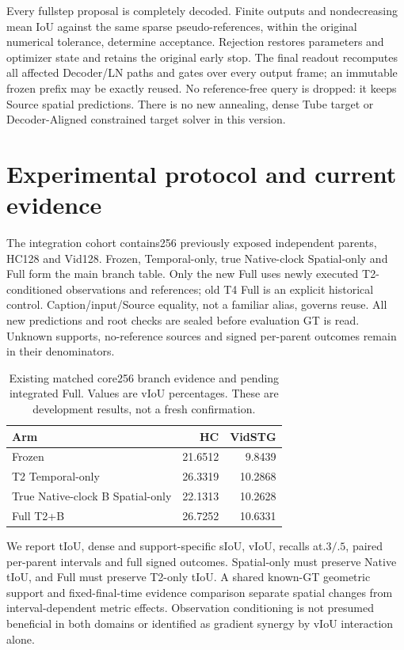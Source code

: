 \documentclass[11pt]{article}
\begin{document}
Every fullstep proposal is completely decoded. Finite outputs and nondecreasing mean IoU against the same sparse pseudo-references, within the original numerical tolerance, determine acceptance. Rejection restores parameters and optimizer state and retains the original early stop. The final readout recomputes all affected Decoder/LN paths and gates over every output frame; an immutable frozen prefix may be exactly reused. No reference-free query is dropped: it keeps Source spatial predictions. There is no new annealing, dense Tube target or Decoder-Aligned constrained target solver in this version.

\section{Experimental protocol and current evidence}
The integration cohort contains256 previously exposed independent parents, HC128 and Vid128. Frozen, Temporal-only, true Native-clock Spatial-only and Full form the main branch table. Only the new Full uses newly executed T2-conditioned observations and references; old T4 Full is an explicit historical control. Caption/input/Source equality, not a familiar alias, governs reuse. All new predictions and root checks are sealed before evaluation GT is read. Unknown supports, no-reference sources and signed per-parent outcomes remain in their denominators.

\begin{table}[h]\centering
\caption{Existing matched core256 branch evidence and pending integrated Full. Values are vIoU percentages. These are development results, not a fresh confirmation.}
\begin{tabular}{lrr}\toprule
Arm & HC & VidSTG\\\midrule
Frozen &21.6512&9.8439\\
T2 Temporal-only &26.3319&10.2868\\
True Native-clock B Spatial-only &22.1313&10.2628\\
Full T2+B &26.7252&10.6331\\\bottomrule
\end{tabular}
\end{table}

We report tIoU, dense and support-specific sIoU, vIoU, recalls at$.3/.5$, paired per-parent intervals and full signed outcomes. Spatial-only must preserve Native tIoU, and Full must preserve T2-only tIoU. A shared known-GT geometric support and fixed-final-time evidence comparison separate spatial changes from interval-dependent metric effects. Observation conditioning is not presumed beneficial in both domains or identified as gradient synergy by vIoU interaction alone.
\end{document}
